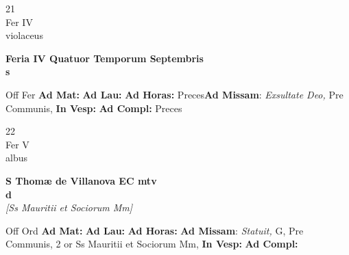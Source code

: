 \documentclass[10pt, openany]{book}
\begin{document}
        \begin{center}
            \begin{minipage}{3.5in}
                \vspace{2em}
                \begin{minipage}{0.5in}
                    {\Huge 21} \\
                    {\normalsize Fer IV} \\
                    {\normalsize violaceus}
                \end{minipage}
                \begin{minipage}{3.0in}
                    \textbf{ \large Feria IV Quatuor Temporum Septembris \\
                    \textnormal{\normalsize s}} \\ 
                \end{minipage}
                \begin{justify}Off Fer
                    \textbf{Ad Mat: }
                    \textbf{Ad Lau: }
                    \textbf{Ad Horas: }Preces\textbf{Ad Missam}: \textit{Exsultate Deo,} Pre Communis,  
                    \textbf{In Vesp: }
                    \textbf{Ad Compl: }Preces
                \end{justify}
            \end{minipage}
        \end{center}
    
        \begin{center}
            \begin{minipage}{3.5in}
                \vspace{2em}
                \begin{minipage}{0.5in}
                    {\Huge 22} \\
                    {\normalsize Fer V} \\
                    {\normalsize albus}
                \end{minipage}
                \begin{minipage}{3.0in}
                    \textbf{ \large S Thomæ de Villanova EC mtv \\
                    \textnormal{\normalsize d}} \\ \textit{[Ss Mauritii et Sociorum Mm]} \\ 
                \end{minipage}
                \begin{justify}Off Ord
                    \textbf{Ad Mat: }
                    \textbf{Ad Lau: }
                    \textbf{Ad Horas: }\textbf{Ad Missam}: \textit{Statuit,} G, Pre Communis, 2 or Ss Mauritii et Sociorum Mm,  
                    \textbf{In Vesp: }
                    \textbf{Ad Compl: }
                \end{justify}
            \end{minipage}
        \end{center}
    
\end{document}
